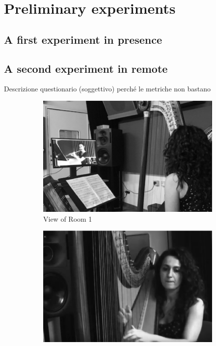 \section{Preliminary experiments}\label{sec:setup}
\subsection{A first experiment in presence}
\subsection{A second experiment in remote}
Descrizione questionario (soggettivo) perché le metriche non bastano






\begin{figure}[t]
	\centering
    \begin{subfigure}[t]{\columnwidth}
		\centering        
		\includegraphics[width=\textwidth]{img/as.eps}
		\caption{View of Room 1}
		\label{subfig:as}
	\end{subfigure}
    \begin{subfigure}[t]{\columnwidth}
	\centering        
	\includegraphics[width=\textwidth]{img/av.eps}

\end{subfigure}
\end{figure}
